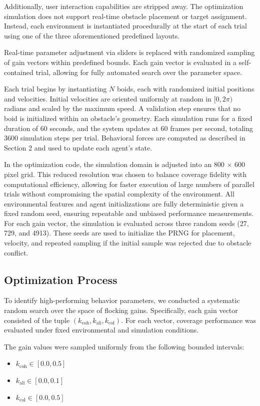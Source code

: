 \documentclass[12pt]{article}
\begin{document}
Additionally, user interaction capabilities are stripped away. The optimization simulation does not support real-time obstacle placement or target assignment. Instead, each environment is instantiated procedurally at the start of each trial using one of the three aforementioned predefined layouts.

Real-time parameter adjustment via sliders is replaced with randomized sampling of gain vectors within predefined bounds. Each gain vector is evaluated in a self-contained trial, allowing for fully automated search over the parameter space.

Each trial begins by instantiating \(N\) boids, each with randomized initial positions and velocities. Initial velocities are oriented uniformly at random in \([0, 2\pi)\) radians and scaled by the maximum speed. A validation step ensures that no boid is initialized within an obstacle's geometry. Each simulation runs for a fixed duration of 60 seconds, and the system updates at 60 frames per second, totaling 3600 simulation steps per trial. Behavioral forces are computed as described in Section 2 and used to update each agent’s state.

In the optimization code, the simulation domain is adjusted into an 800 \(\times\) 600 pixel grid. This reduced resolution was chosen to balance coverage fidelity with computational efficiency, allowing for faster execution of large numbers of parallel trials without compromising the spatial complexity of the environment. All environmental features and agent initializations are fully deterministic given a fixed random seed, ensuring repeatable and unbiased performance measurements. For each gain vector, the simulation is evaluated across three random seeds (27, 729, and 4913). These seeds are used to initialize the PRNG for placement, velocity, and repeated sampling if the initial sample was rejected due to obstacle conflict.

\subsection{Optimization Process}

To identify high-performing behavior parameters, we conducted a systematic random search over the space of flocking gains. Specifically, each gain vector consisted of the tuple \((k_\text{coh}, k_\text{ali}, k_\text{col})\). For each vector, coverage performance was evaluated under fixed environmental and simulation conditions.

The gain values were sampled uniformly from the following bounded intervals:
\begin{itemize}[nosep]
    \item \(k_\text{coh} \in [0.0, 0.5]\)
    \item \(k_\text{ali} \in [0.0, 0.1]\)
    \item \(k_\text{col} \in [0.0, 0.5]\)
\end{itemize}
\end{document}
